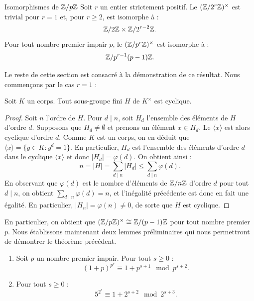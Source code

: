 \documentclass[]{report}
\begin{document}
\begin{tm}{Isomorphismes de $\mathbb{Z}/p\mathbb{Z}$}{}
    Soit $r$ un entier strictement positif. Le \gr $(\mathbb{Z}/2^r\mathbb{Z})^{\times}$ est trivial pour $r = 1$ et, pour $r \ge 2$, est isomorphe à :
    \[\mathbb{Z}/2\mathbb{Z} \times \mathbb{Z}/2^{r-2}\mathbb{Z}.\]
    Pour tout nombre premier impair $p$, le \gr $(\mathbb{Z}/p^r\mathbb{Z})^{\times}$ est isomorphe à :
    \[\mathbb{Z}/p^{r-1}(p-1)\mathbb{Z}.\]
\end{tm}

Le reste de cette section est consacré à la démonstration de ce résultat. Nous commençons par le cas $r = 1$ :

\begin{prop}{}{}
    Soit $K$ un corps. Tout sous-groupe fini $H$ de $K^{\times}$ est cyclique.
\end{prop}


\begin{proof}
    Soit $n$ l'ordre de $H$. Pour $d \mid n$, soit $H_d$ l'ensemble des éléments de $H$ d'ordre $d$. Supposons que $H_d \neq \emptyset$ et prenons un élément $x \in H_d$. Le \gr $\langle x \rangle$ est alors cyclique d'ordre $d$. Comme $K$ est un corps, on en déduit que $\langle x \rangle = \{y \in K : y^d = 1\}$. En particulier, $H_d$ est l'ensemble des éléments d'ordre $d$ dans le \gr cyclique $\langle x \rangle$ et donc $|H_d| = \varphi(d)$. On obtient ainsi :
    \[n = |H| = \sum_{d \mid n} |H_d| \le \sum_{d \mid n} \varphi(d).\]
    En observant que $\varphi(d)$ est le nombre d'éléments de $\mathbb{Z}/n\mathbb{Z}$ d'ordre $d$ pour tout $d \mid n$, on obtient $\sum_{d \mid n}\varphi(d) = n$, et l'inégalité précédente est donc en fait une égalité. En particulier, $|H_n| = \varphi(n) \neq 0$, de sorte que $H$ est cyclique.
\end{proof}

En particulier, on obtient que $(\mathbb{Z}/p\mathbb{Z})^{\times} \cong \mathbb{Z}/(p-1)\mathbb{Z}$ pour tout nombre premier $p$. Nous établissons maintenant deux lemmes préliminaires qui nous permettront de démontrer le théorème précédent.

\begin{lm}{}{}
    \begin{enumerate}
        \item[(i)] Soit $p$ un nombre premier impair. Pour tout $s \ge 0$ :
        \[(1 + p)^{p^s} \equiv 1 + p^{s+1} \mod p^{s+2}.\]
        \item[(ii)] Pour tout $s \ge 0$ :
        \[5^{2^s} \equiv 1 + 2^{s+2} \mod 2^{s+3}.\]
    \end{enumerate}
\end{lm}
\end{document}
